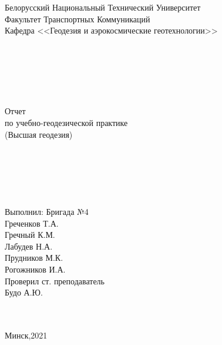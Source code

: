 \documentclass[a4paper]{article}
\begin{document}
    \begin{titlepage}
    \large{
        \begin{center}
            Белорусский Национальный Технический Университет\\
            Факультет Транспортных Коммуникаций\\
            Кафедра <<Геодезия и аэрокосмические геотехнологии>>\\
            ~\\
            ~\\
            ~\\
            ~\\
            ~\\
            ~\\
            Отчет\\
            по учебно-геодезической практике\\
            (Высшая геодезия)\\
            ~\\
            ~\\
            ~\\
            ~\\
            ~\\
        \end{center}
        
        \begin{flushright}
            Выполнил: Бригада №4\\
            Греченков Т.А.\\
            Гречный К.М.\\
            Лабудев Н.А.\\
            Прудников М.К.\\
            Рогожников И.А.\\
            Проверил ст. преподаватель\\
            Будо А.Ю.
            ~\\
            ~\\
            ~\\
            \begin{center}
                Минск,2021
            \end{center}
            
        \end{flushright}
    }
\end{titlepage}
\end{document}
